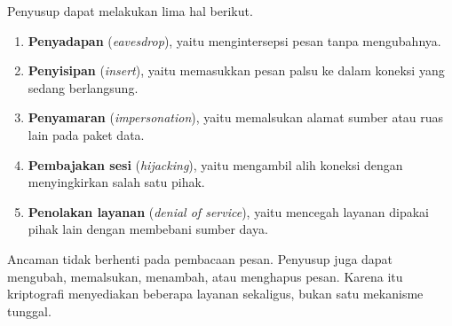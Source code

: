 Penyusup dapat melakukan lima hal berikut.
\begin{enumerate}
    \item \textbf{Penyadapan} (\textit{eavesdrop}), yaitu mengintersepsi pesan
          tanpa mengubahnya.
    \item \textbf{Penyisipan} (\textit{insert}), yaitu memasukkan pesan palsu ke
          dalam koneksi yang sedang berlangsung.
    \item \textbf{Penyamaran} (\textit{impersonation}), yaitu memalsukan alamat
          sumber atau ruas lain pada paket data.
    \item \textbf{Pembajakan sesi} (\textit{hijacking}), yaitu mengambil alih
          koneksi dengan menyingkirkan salah satu pihak.
    \item \textbf{Penolakan layanan} (\textit{denial of service}), yaitu
          mencegah layanan dipakai pihak lain dengan membebani sumber daya.
\end{enumerate}

Ancaman tidak berhenti pada pembacaan pesan. Penyusup juga dapat mengubah,
memalsukan, menambah, atau menghapus pesan. Karena itu kriptografi menyediakan
beberapa layanan sekaligus, bukan satu mekanisme tunggal.
